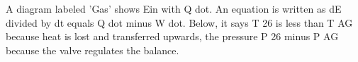 A diagram labeled 'Gas' shows Ein with Q dot. An equation is written as dE divided by dt equals Q dot minus W dot. Below, it says T 26 is less than T AG because heat is lost and transferred upwards, the pressure P 26 minus P AG because the valve regulates the balance.
